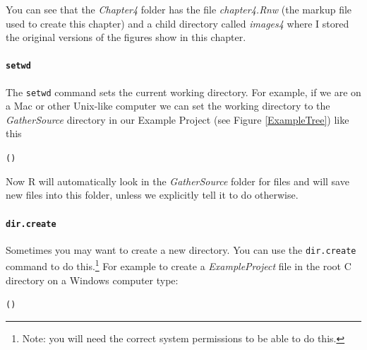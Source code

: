 \documentclass[krantz1]{krantz}
\begin{document}
\noindent You can see that the \emph{Chapter4} folder has the file \emph{chapter4.Rnw} (the markup file used to create this chapter) and a child directory called \emph{images4} where I stored the original versions of the figures show in this chapter.

\paragraph{{\tt{setwd}}}

The {\tt{setwd}} command sets the current working directory. For example, if we are on a Mac or other Unix-like computer we can set the working directory to the {\emph{GatherSource}} directory in our Example Project (see Figure \ref{ExampleTree}) like this

\begin{knitrout}
\color{fgcolor}\begin{kframe}
\begin{alltt}
()
\end{alltt}
\end{kframe}
\end{knitrout}


\noindent Now R will automatically look in the {\emph{GatherSource}} folder for files and will save new files into this folder, unless we explicitly tell it to do otherwise.

\paragraph{{\tt{dir.create}}}

Sometimes you may want to create a new directory. You can use the {\tt{dir.create}} command to do this.\footnote{Note: you will need the correct system permissions to be able to do this.} For example to create a {\emph{ExampleProject}} file in the root C directory on a Windows computer type:

\begin{knitrout}
\color{fgcolor}\begin{kframe}
\begin{alltt}
()
\end{alltt}
\end{kframe}
\end{knitrout}
\end{document}
